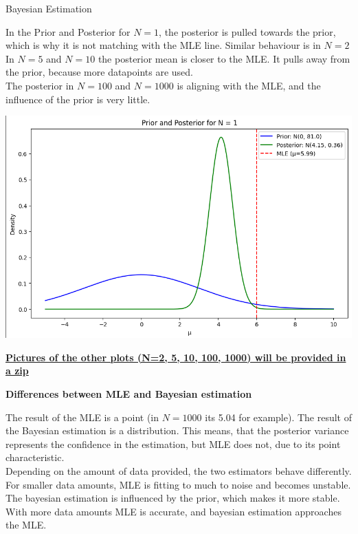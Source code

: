 \documentclass[
	english,
        solution=true
	]{tudaexercise}
\begin{document}
\begin{task}[points=16]{Bayesian Estimation}
\begin{solution}
In the Prior and Posterior for $N=1$, the posterior is pulled towards the prior, which is why it is not matching with the MLE line. Similar behaviour is in $N=2$\\
In $N=5$ and $N=10$ the posterior mean is closer to the MLE. It pulls away from the prior, because more datapoints are used.\\
The posterior in $N=100$ and $N=1000$ is aligning with the MLE, and the influence of the prior is very little.\\

\begin{center}
    \includegraphics[width=0.75\linewidth]{priorAndPosteriorN1.png}
\end{center}

\underline{\textbf{Pictures of the other plots (N=2, 5, 10, 100, 1000) will be provided in a zip}}

\textbf{Differences between MLE and Bayesian estimation}

The result of the MLE is a point (in $N=1000$ its 5.04 for example). The result of the Bayesian estimation is a distribution. This means, that the posterior variance represents the confidence in the estimation, but MLE does not, due to its point characteristic. \\

Depending on the amount of data provided, the two estimators behave differently. For smaller data amounts, MLE is fitting to much to noise and becomes unstable. The bayesian estimation is influenced by the prior, which makes it more stable. With more data amounts MLE is accurate, and bayesian estimation approaches the MLE.



\end{solution}
\end{task}

\newpage
\end{document}

